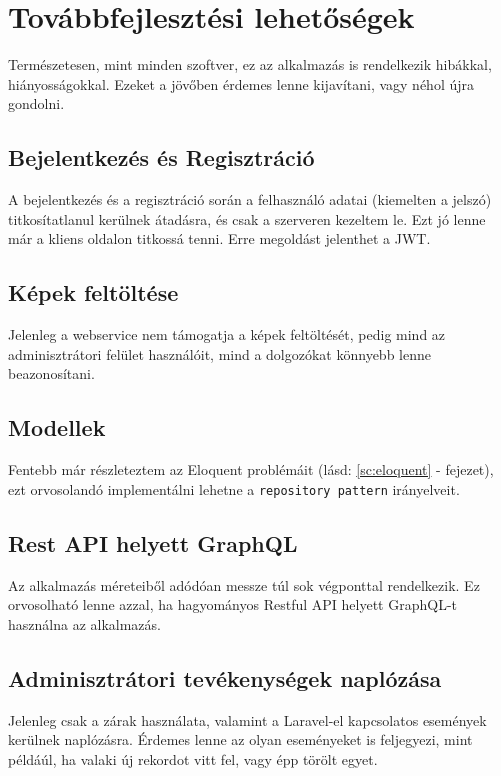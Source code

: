 \documentclass[a4paper,12pt]{thesis-ekf}
\theoremstyle{definition}
\begin{document}
	\chapter{Továbbfejlesztési lehetőségek}\label{ch-todo}
		Természetesen, mint minden szoftver, ez az alkalmazás is rendelkezik hibákkal, hiányosságokkal. Ezeket a jövőben érdemes lenne kijavítani, vagy néhol újra gondolni.
		
		\section*{Bejelentkezés és Regisztráció}
			A bejelentkezés és a regisztráció során a felhasználó adatai (kiemelten a jelszó) titkosítatlanul kerülnek átadásra, és csak a szerveren kezeltem le. Ezt jó lenne már a kliens oldalon titkossá tenni. Erre megoldást jelenthet a JWT.
			
		\section*{Képek feltöltése}
			Jelenleg a webservice nem támogatja a képek feltöltését, pedig mind az adminisztrátori felület használóit, mind a dolgozókat könnyebb lenne beazonosítani.
		
		\section*{Modellek}
			Fentebb már részleteztem az Eloquent problémáit (lásd: \ref{sc:eloquent} -  fejezet), ezt orvosolandó implementálni lehetne a \texttt{repository pattern} irányelveit.
		
		\section*{Rest API helyett GraphQL}
			Az alkalmazás méreteiből adódóan messze túl sok végponttal rendelkezik. Ez orvosolható lenne azzal, ha hagyományos Restful API helyett GraphQL-t használna az alkalmazás.
		
		\section*{Adminisztrátori tevékenységek naplózása}
			Jelenleg csak a zárak használata, valamint a Laravel-el kapcsolatos események kerülnek naplózásra. Érdemes lenne az olyan eseményeket is feljegyezi, mint példáúl, ha valaki új rekordot vitt fel, vagy épp törölt egyet.
			
\end{document}
